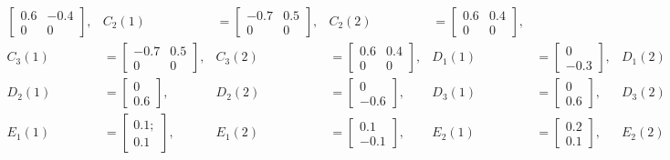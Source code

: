\documentclass[11pt,draftcls,onecolumn]{IEEEtran}
\begin{document}
\begin{align*}
\begin{bmatrix}
 0.6 & -0.4\\
 0 & 0
 \end{bmatrix},
& C_2(1)&=
 \begin{bmatrix}
 -0.7 & 0.5\\
 0& 0
 \end{bmatrix},
   &C_2(2)&=
  \begin{bmatrix}
  0.6& 0.4\\
  0&    0
  \end{bmatrix},\\
 C_3(1)&=
 \begin{bmatrix}-0.7 &  0.5\\
 0& 0
 \end{bmatrix},
  & C_3(2)&=
  \begin{bmatrix}
  0.6& 0.4\\
  0&    0
  \end{bmatrix},
 &D_1(1)&=  \begin{bmatrix} 0\\-0.3 \end{bmatrix},
   & D_1(2)&= \begin{bmatrix}0\\0.3\end{bmatrix},\\
  D_2(1)&=  \begin{bmatrix}0\\0.6\end{bmatrix},
     &D_2(2)&=  \begin{bmatrix}0\\-0.6\end{bmatrix},
  &D_3(1)&=  \begin{bmatrix}0\\0.6\end{bmatrix},
   & D_3(2)&=  \begin{bmatrix}0\\-0.6\end{bmatrix},\\
 E_1(1)&=  \begin{bmatrix}0.1;\\0.1\end{bmatrix},
  & E_1(2)&=  \begin{bmatrix}0.1\\-0.1\end{bmatrix},
 & E_2(1)&=  \begin{bmatrix}0.2\\0.1\end{bmatrix},
  & E_2(2)&=  \begin{bmatrix}0.1\\0.2\end{bmatrix},\\

\end{align*}
\end{document}
